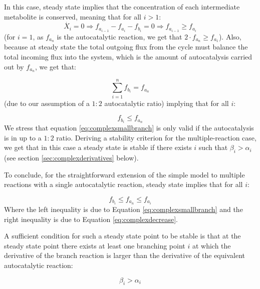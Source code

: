     In this case, steady state implies that the concentration of each intermediate metabolite is conserved, meaning that for all $i>1$:
    \begin{equation}
        \label{eq:complexdecrease}
      \dot{X_i}=0 \Rightarrow f_{a_{i-1}}-f_{a_i}-f_{b_i}=0 \Rightarrow f_{a_{i-1}} \geq f_{a_i}
    \end{equation}
    (for $i=1$, as $f_{a_n}$ is the autocatalytic reaction, we get that $2\cdot f_{a_{n}} \geq f_{a_1}$).
    Also, because at steady state the total outgoing flux from the cycle must balance the total incoming flux into the system, which is the amount of autocatalysis carried out by $f_{a_n}$, we get that:

    \begin{equation*}
      \sum_{i=1}^n f_{b_i}=f_{a_n}
  \end{equation*}
 (due to our assumption of a $1\mathbin{:}2$ autocatalytic ratio) implying that for all $i$:

    \begin{equation}
        \label{eq:complexsmallbranch}
        f_{b_i} \leq f_{a_n}
  \end{equation}
  We stress that equation \ref{eq:complexsmallbranch} is only valid if the autocatalysis is in up to a $1\mathbin{:}2$ ratio.
  Deriving a stability criterion for the multiple-reaction case, we get that in this case a steady state is stable if there exists $i$ such that $\beta_i > \alpha_i$ (see section \ref{sec:complexderivatives} below).

  To conclude, for the straightforward extension of the simple model to multiple reactions with a single autocatalytic reaction, steady state implies that for all $i$:

    \begin{equation}
        f_{b_i} \leq f_{a_n} \leq f_{a_i}
      \label{eq:complexstst}
    \end{equation}
    Where the left inequality is due to Equation \ref{eq:complexsmallbranch} and the right inequality is due to Equation \ref{eq:complexdecrease}.

    A sufficient condition for such a steady state point to be stable is that at the steady state point there exists at least one branching point $i$ at which the derivative of the branch reaction is larger than the derivative of the equivalent autocatalytic reaction:

    \begin{equation}
      \beta_i > \alpha_i
      \label{eq:complexstab}
    \end{equation}

